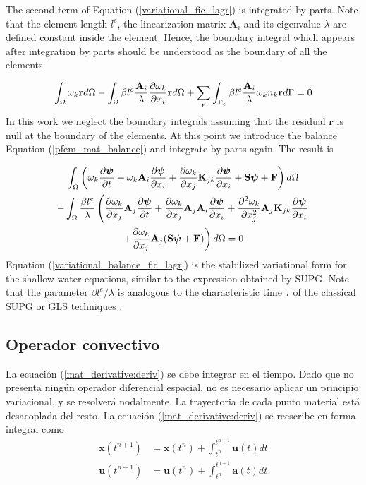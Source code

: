 The second term of Equation (\ref{variational_fic_lagr}) is integrated by parts. Note that the element length $l^e$, the linearization matrix $\mathbf{A}_i$ and its eigenvalue $\lambda$ are defined constant inside the element. Hence, the boundary integral which appears after integration by parts should be understood as the boundary of all the elements

\begin{equation} \label{variational_fic_lagr_parts}
\int_\Omega \omega_k \mathbf{r} d\Omega
- \int_\Omega \beta l^e\frac{\mathbf{A}_i}{\lambda}\frac{\partial\omega_k}{\partial x_i} \mathbf{r} d\Omega
+ \sum_e \int_{\Gamma_e} \beta l^e\frac{\mathbf{A}_i}{\lambda}\omega_kn_k \mathbf{r} d\Gamma = 0
\end{equation}
In this work we neglect the boundary integrals assuming that the residual $\mathbf{r}$ is null at the boundary of the elements. At this point we introduce the balance Equation (\ref{pfem_mat_balance}) and integrate by parts again. The result is

\begin{multline} \label{variational_balance_fic_lagr}
\int_\Omega \left(
    \omega_k \frac{\partial\bm{\psi}}{\partial t} + \omega_k \mathbf{A}_i\frac{\partial\bm{\psi}}{\partial x_i}
    + \frac{\partial\omega_k}{\partial x_j} \mathbf{K}_{jk} \frac{\partial\bm{\psi}}{\partial x_i} + \mathbf{S}\bm{\psi} + \mathbf{F}
\right) d\Omega\\ -
\int_\Omega \frac{\beta l^e}{\lambda} \left(
    \frac{\partial\omega_k}{\partial x_j} \mathbf{A}_j \frac{\partial\bm{\psi}}{\partial t}
    + \frac{\partial\omega_k}{\partial x_j} \mathbf{A}_j\mathbf{A}_i\frac{\partial\bm{\psi}}{\partial x_i}
    + \frac{\partial^2\omega_k}{\partial x_j^2} \mathbf{A}_j\mathbf{K}_{jk} \frac{\partial\bm{\psi}}{\partial x_i} \right. \\
    \left.
    + \frac{\partial\omega_k}{\partial x_j} \mathbf{A}_j(\mathbf{S}\bm{\psi} + \mathbf{F})
\right) d\Omega
=0
\end{multline}
Equation (\ref{variational_balance_fic_lagr}) is the stabilized variational form for the shallow water equations, similar to the expression obtained by SUPG. Note that the parameter $\beta l^e/\lambda$ is analogous to the characteristic time $\tau$ of the classical SUPG or GLS techniques \cite{cotela2016}.



\subsection{Operador convectivo}

La ecuación (\ref{mat_derivative:deriv}) se debe integrar en el tiempo. Dado que no presenta ningún operador diferencial espacial, no es necesario aplicar un principio variacional, y se resolverá nodalmente. La trayectoria de cada punto material está desacoplada del resto. La ecuación (\ref{mat_derivative:deriv}) se reescribe en forma integral como
\begin{subequations}
\begin{align}
    \mathbf{x}(t^{n+1}) &= \mathbf{x}(t^n) + \int_{t^n}^{t^{n+1}} \mathbf{u}(t) dt \\
    \mathbf{u}(t^{n+1}) &= \mathbf{u}(t^n) + \int_{t^n}^{t^{n+1}} \mathbf{a}(t) dt
\end{align}
\end{subequations}



